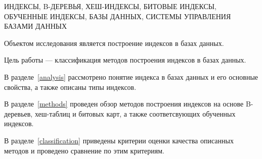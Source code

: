 \begin{essay}{}
    \noindent\mbox{ИНДЕКСЫ,} \mbox{B-ДЕРЕВЬЯ,} \mbox{ХЕШ-ИНДЕКСЫ,}
    \mbox{БИТОВЫЕ} \mbox{ИНДЕКСЫ,} \mbox{ОБУЧЕННЫЕ} \mbox{ИНДЕКСЫ,} \mbox{БАЗЫ}
    \mbox{ДАННЫХ,} \mbox{СИСТЕМЫ} \mbox{УПРАВЛЕНИЯ} \mbox{БАЗАМИ} \mbox{ДАННЫХ}

    Объектом исследования является построение индексов в базах данных.

    Цель работы --- классификация методов построения индексов в базах данных.

    В разделе~\ref{analysis} рассмотрено понятие индекса в базах данных и его
    основные свойства, а также описаны типы индексов.

    В разделе~\ref{methods} проведен обзор методов построения индексов на основе
    B-деревьев, хеш-таблиц и битовых карт, а также соответсвующих обученных
    индексов.

    В разделе~\ref{classification} приведены критерии оценки качества описанных
    методов и проведено сравнение по этим критериям.


\end{essay}
